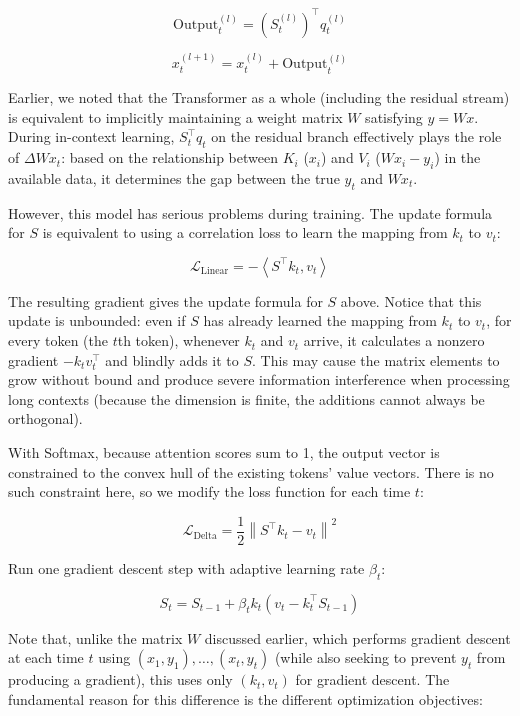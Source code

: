 \[
\mathrm{Output}_t^{(l)}=\left(S_t^{(l)}\right)^\top q_t^{(l)}
\]

\[
x_t^{(l+1)}=x_t^{(l)}+\mathrm{Output}_t^{(l)}
\]

Earlier, we noted that the Transformer as a whole (including the residual stream) is equivalent to implicitly maintaining a weight matrix \(W\) satisfying \(y=Wx\). During in-context learning, \(S_t^\top q_t\) on the residual branch effectively plays the role of \(\Delta W x_t\): based on the relationship between \(K_i\) (\(x_i\)) and \(V_i\) (\(Wx_i-y_i\)) in the available data, it determines the gap between the true \(y_t\) and \(Wx_t\).

However, this model has serious problems during training. The update formula for \(S\) is equivalent to using a correlation loss to learn the mapping from \(k_t\) to \(v_t\):

\[
\mathcal{L}_{\mathrm{Linear}}=-\left\langle S^\top k_t,v_t\right\rangle
\]

The resulting gradient gives the update formula for \(S\) above. Notice that this update is unbounded: even if \(S\) has already learned the mapping from \(k_t\) to \(v_t\), for every token (the \(t\)th token), whenever \(k_t\) and \(v_t\) arrive, it calculates a nonzero gradient \(-k_tv_t^\top\) and blindly adds it to \(S\). This may cause the matrix elements to grow without bound and produce severe information interference when processing long contexts (because the dimension is finite, the additions cannot always be orthogonal).

With Softmax, because attention scores sum to 1, the output vector is constrained to the convex hull of the existing tokens' value vectors. There is no such constraint here, so we modify the loss function for each time \(t\):

\[
\mathcal{L}_{\mathrm{Delta}}=\frac{1}{2}\left\lVert S^\top k_t-v_t\right\rVert^2
\]

Run one gradient descent step with adaptive learning rate \(\beta_t\):

\[
S_t=S_{t-1}+\beta_tk_t\left(v_t-k_t^\top S_{t-1}\right)
\]

Note that, unlike the matrix \(W\) discussed earlier, which performs gradient descent at each time \(t\) using \((x_1,y_1),\ldots,(x_t,y_t)\) (while also seeking to prevent \(y_t\) from producing a gradient), this uses only \((k_t,v_t)\) for gradient descent. The fundamental reason for this difference is the different optimization objectives:

